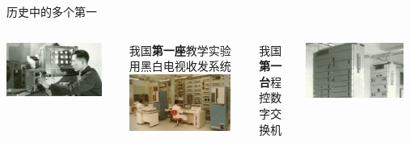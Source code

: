 \documentclass[aspectratio=169, utf8]{beamer}
\begin{document}
\begin{frame}{历史中的多个第一}
    \begin{columns}
        \centering
        \scriptsize
        \includegraphics[width=0.9\textwidth]{./resources/3.jpg}

        我国\textcolor{Fore}{\textbf{第一座}}教学实验用黑白电视收发系统\\[1em]

        \includegraphics[width=0.9\textwidth]{./resources/4.jpg}

        我国\textcolor{Fore}{\textbf{第一台}}程控数字交换机

        \centering
        \scriptsize
        \includegraphics[width=0.9\textwidth]{./resources/5.jpg}


\end{columns}
\end{frame}
\end{document}
